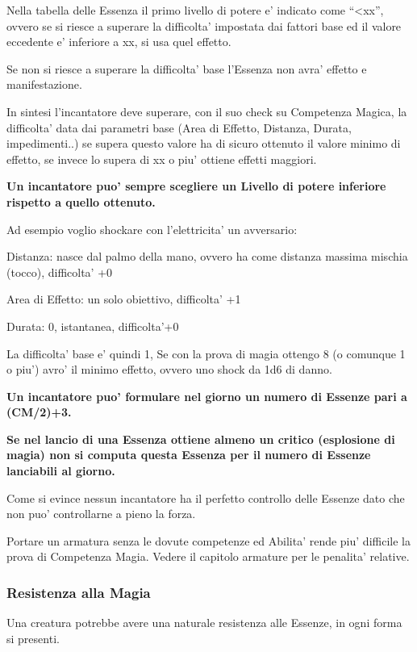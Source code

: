 \documentclass[a4paper,11pt,twoside,openany]{dndbook}
\begin{document}
Nella tabella delle Essenza il primo livello di potere e' indicato come ``\textless xx'', ovvero se si riesce a superare la difficolta' impostata dai fattori base ed il valore eccedente e' inferiore a xx, si usa quel effetto.

Se non si riesce a superare la difficolta' base l'Essenza non avra' effetto e manifestazione.

In sintesi l'incantatore deve superare, con il suo check su Competenza Magica, la difficolta' data dai parametri base (Area di Effetto, Distanza, Durata, impedimenti..) se supera questo valore ha di sicuro ottenuto il valore minimo di effetto, se invece lo supera di xx o piu' ottiene effetti maggiori.

\bigskip

 \textbf{Un incantatore puo' sempre scegliere un Livello di potere
inferiore rispetto a quello ottenuto.}

Ad esempio voglio shockare con l'elettricita' un avversario:

Distanza: nasce dal palmo della mano, ovvero ha come distanza massima mischia (tocco), difficolta' +0

Area di Effetto: un solo obiettivo, difficolta' +1

Durata: 0, istantanea, difficolta'+0

La difficolta' base e' quindi 1, Se con la prova di magia ottengo 8 (o comunque 1 o piu') avro' il minimo effetto, ovvero uno shock da 1d6 di danno.

\bigskip

\textbf{Un incantatore puo' formulare nel giorno un numero di Essenze pari a (CM/2)+3.}

\textbf{Se nel lancio di una Essenza ottiene almeno un critico (esplosione di magia) non si computa questa Essenza per il numero di Essenze lanciabili al giorno.}

Come si evince nessun incantatore ha il perfetto controllo delle Essenze dato che non puo' controllarne a pieno la forza.

Portare un armatura senza le dovute competenze ed Abilita' rende piu' difficile la prova di Competenza Magia. Vedere il capitolo armature per le penalita' relative.

\subsubsection{Resistenza alla Magia}

Una creatura potrebbe avere una naturale resistenza alle Essenze, in ogni forma si presenti.
\end{document}
